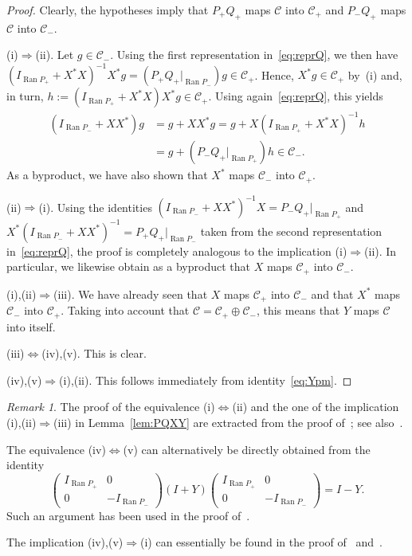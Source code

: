 \documentclass[11pt,a4paper]{amsart}
\numberwithin{equation}{section}
\DeclareMathOperator{\Ran}{Ran}
\newcommand{\cC}{{\mathcal C}}
\theoremstyle{plain}
\theoremstyle{definition}
\theoremstyle{remark}
\newtheorem{remark}[theorem]{Remark}
\begin{document}
\begin{proof}
  Clearly, the hypotheses imply that $P_+Q_+$ maps $\cC$ into $\cC_+$ and $P_-Q_+$ maps $\cC$ into $\cC_-$.
  
  (i)$\Rightarrow$(ii).
  Let $g \in \cC_-$. Using the first representation in~\eqref{eq:reprQ}, we then have
  $(I_{\Ran P_+} + X^*X)^{-1}X^*g = (P_+Q_+|_{\Ran P_-})g \in \cC_+$. Hence, $X^*g \in \cC_+$ by~(i) and, in turn,
  $h := (I_{\Ran P_+} + X^*X)X^*g \in \cC_+$. Using again~\eqref{eq:reprQ}, this yields
  \begin{align*}
    (I_{\Ran P_-} + XX^*)g
    &=
    g + XX^*g
      =
      g + X(I_{\Ran P_+}+X^*X)^{-1}h\\
    &=
    g + (P_-Q_+|_{\Ran P_+})h \in \cC_-
    .
  \end{align*}
  As a byproduct, we have also shown that $X^*$ maps $\cC_-$ into $\cC_+$.

  (ii)$\Rightarrow$(i).
  Using the identities $(I_{\Ran P_-} + XX^*)^{-1}X = P_-Q_+|_{\Ran P_+}$ and $X^*(I_{\Ran P_-}+XX^*)^{-1} = P_+Q_+|_{\Ran P_-}$
  taken from the second representation in~\eqref{eq:reprQ}, the proof is completely analogous to the implication
  (i)$\Rightarrow$(ii). In particular, we likewise obtain as a byproduct that $X$ maps $\cC_+$ into $\cC_-$.

  (i),(ii)$\Rightarrow$(iii).
  We have already seen that $X$ maps $\cC_+$ into $\cC_-$ and that $X^*$ maps $\cC_-$ into $\cC_+$. Taking into account that
  $\cC = \cC_+ \oplus \cC_-$, this means that $Y$ maps $\cC$ into itself.

  (iii)$\Leftrightarrow$(iv),(v).
  This is clear.

  (iv),(v)$\Rightarrow$(i),(ii).
  This follows immediately from identity~\eqref{eq:Ypm}.
\end{proof}%

\begin{remark}\label{rem:PQXY}
  The proof of the equivalence (i)$\Leftrightarrow$(ii) and the one of the implication (i),(ii)$\Rightarrow$(iii) in
  Lemma~\ref{lem:PQXY} are extracted from the proof of~\cite[Theorem~5.1]{GKMSV17}; see also~\cite[Theorem~6.3.1 and
  Lemma~6.3.3]{SchmDiss}.

  The equivalence (iv)$\Leftrightarrow$(v) can alternatively be directly obtained from the identity
  \begin{equation*}
    \begin{pmatrix}
      I_{\Ran P_+} & 0\\
      0 & -I_{\Ran P_-}
    \end{pmatrix}
    (I + Y)
    \begin{pmatrix}
      I_{\Ran P_+} & 0\\
      0 & -I_{\Ran P_-}
    \end{pmatrix}
    =
    I - Y
    .
  \end{equation*}
  Such an argument has been used in the proof of~\cite[Proposition~3.3]{MSS16}.

  The implication (iv),(v)$\Rightarrow$(i) can essentially be found in the proof of~\cite[Theorem~5.1]{GKMSV17}
  and~\cite[Remark~6.3.2]{SchmDiss}.
\end{remark}
\end{document}
